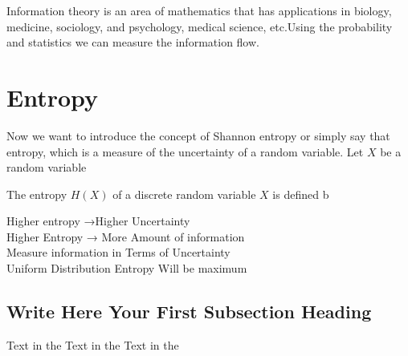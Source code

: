 

Information theory is an area of mathematics that has applications in biology, medicine, sociology, and psychology, medical science, etc.Using the probability and statistics we can measure the information flow. 
\section{Entropy}
\hspace{4em}
Now we want to introduce the concept of Shannon entropy or simply say that entropy, which is a measure of the uncertainty of a random variable. Let $X$ be a random variable 
\begin{definition}[Entropy]
 The entropy $H (X)$ of a discrete random variable $ X$ is
defined b
\end{definition} 


Higher entropy →Higher Uncertainty \\
Higher Entropy → More Amount of information \\
Measure information in Terms of Uncertainty \\
Uniform Distribution Entropy Will be maximum

\subsection{Write Here Your First Subsection Heading}
\hspace{4em}
Text in the 
\hspace{4em}
Text in the  
\hspace{4em}
Text in the  
